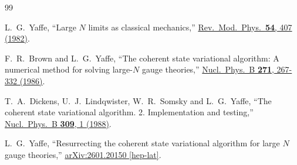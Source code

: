 \documentclass [12pt]{article}
\begin{document}
\begin{thebibliography}{99}

L.~G.~Yaffe,
``Large $N$ limits as classical mechanics,''
\href{https://doi.org/10.1103/RevModPhys.54.407}
{Rev.~Mod.~Phys.~\textbf{54}, 407 (1982)}.

F.~R.~Brown and L.~G.~Yaffe,
``The coherent state variational algorithm:
A numerical method for solving large-$N$ gauge theories,''
\href{https://doi.org/10.1016/0550-3213(86)90318-4}
{Nucl.~Phys.~B \textbf{271}, 267-332 (1986)}.

T.~A.~Dickens, U.~J.~Lindqwister, W.~R.~Somsky and L.~G.~Yaffe,
``The coherent state variational algorithm. 2. Implementation and testing,''
\href{https://doi.org/10.1016/0550-3213(88)90234-9}
{Nucl.~Phys.~B \textbf{309}, 1 (1988)}.

L.~G.~Yaffe,
``Resurrecting the coherent state variational algorithm for large $N$ gauge theories,''
\href{https://arxiv.org/abs/2601.20150}
{arXiv:2601.20150 [hep-lat]}.

\end{thebibliography}
\end{document}
